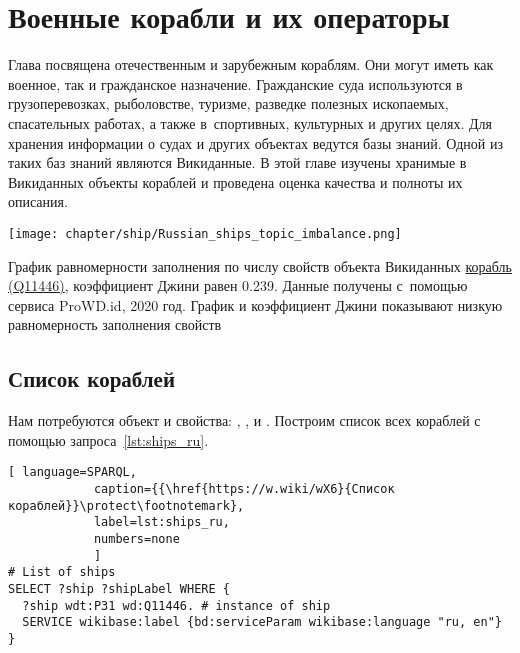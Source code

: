 \chapter{Военные корабли и их операторы}
\label{ch:ships-chapter}

Глава посвящена отечественным и зарубежным кораблям. 
Они могут иметь как военное, так и гражданское назначение. 
Гражданские суда используются в грузоперевозках, рыболовстве, туризме, 
разведке полезных ископаемых, спасательных работах, 
а также в~спортивных, культурных и других целях. 
Для хранения информации о судах и других объектах ведутся базы знаний. 
Одной из таких баз знаний являются Викиданные. 
В этой главе изучены хранимые в Викиданных объекты кораблей и проведена оценка качества и полноты их описания.


\begin{marginfigure}[0.0cm]
  \texttt{[image: chapter/ship/Russian\_ships\_topic\_imbalance.png]}
  \caption[График равномерности заполнения свойств объектов Викиданных.]{График равномерности заполнения по числу свойств объекта Викиданных \href{https://www.wikidata.org/wiki/Q11446}{корабль (Q11446)}, коэффициент Джини равен 0.239. Данные получены с~помощью сервиса ProWD.id, 2020 год. График и коэффициент Джини показывают низкую равномерность заполнения свойств}%
  \label{fig:prowd_ships-unbalanced}%
\end{marginfigure}


\section{Список кораблей}

Нам потребуются объект  и свойства:
   , 
   , 
    и  
   .
Построим список всех кораблей с помощью запроса~\ref{lst:ships_ru}.


\begin{lstlisting}[ language=SPARQL, 
            caption={{\href{https://w.wiki/wX6}{Список кораблей}}\protect\footnotemark}, 
            label=lst:ships_ru, 
            numbers=none
            ]
# List of ships
SELECT ?ship ?shipLabel WHERE {
  ?ship wdt:P31 wd:Q11446. # instance of ship
  SERVICE wikibase:label {bd:serviceParam wikibase:language "ru, en"}
}
\end{lstlisting}


